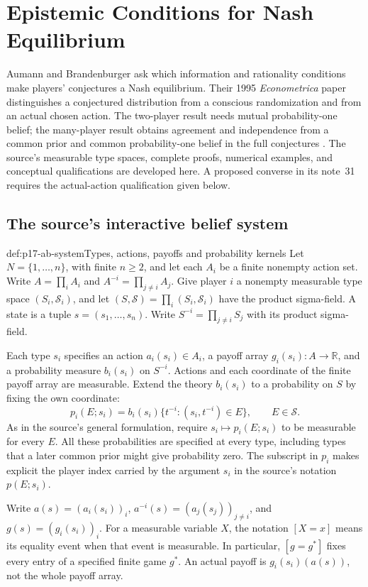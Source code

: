 \chapter{Epistemic Conditions for Nash Equilibrium}
\label{sec:p17-epistemic-nash-conditions}

Aumann and Brandenburger ask which information and rationality conditions
make players' conjectures a Nash equilibrium. Their 1995 \emph{Econometrica}
paper distinguishes a conjectured distribution from a conscious randomization
and from an actual chosen action. The two-player result needs mutual
probability-one belief; the many-player result obtains agreement and
independence from a common prior and common probability-one belief in
the full conjectures \parencite[pp.~1161--1164]{AumannBrandenburger1995Epistemic}.
The source's measurable type spaces, complete proofs, numerical examples,
and conceptual qualifications are developed here. A proposed converse in
its note~31 requires the actual-action qualification given below.

\section{The source's interactive belief system}

\begin{hbdefinition}{def:p17-ab-system}{Types, actions, payoffs and probability kernels}
Let \(N=\{1,\ldots,n\}\), with finite \(n\geq2\), and let each \(A_i\)
be a finite nonempty action set. Write \(A=\prod_iA_i\) and
\(A^{-i}=\prod_{j\ne i}A_j\). Give player \(i\) a nonempty measurable
type space \((S_i,\mathcal S_i)\), and let
\((S,\mathcal S)=\prod_i(S_i,\mathcal S_i)\) have the product sigma-field.
A state is a tuple \(s=(s_1,\ldots,s_n)\).
Write \(S^{-i}=\prod_{j\ne i}S_j\) with its product sigma-field.

Each type \(s_i\) specifies an action \(a_i(s_i)\in A_i\), a payoff
array \(g_i(s_i):A\to\mathbb R\), and a probability measure
\(b_i(s_i)\) on \(S^{-i}\). Actions and each coordinate of the
finite payoff array are measurable. Extend the theory \(b_i(s_i)\)
to a probability on \(S\) by fixing the own coordinate:
\[
 p_i(E;s_i)=b_i(s_i)\{t^{-i}:(s_i,t^{-i})\in E\},
 \qquad E\in\mathcal S.
\]
As in the source's general formulation, require
\(s_i\mapsto p_i(E;s_i)\) to be measurable for every \(E\).
All these probabilities are specified at every type, including
types that a later common prior might give probability zero.
The subscript in \(p_i\) makes explicit the player index carried
by the argument \(s_i\) in the source's notation \(p(E;s_i)\).

Write \(a(s)=(a_i(s_i))_i\), \(a^{-i}(s)=(a_j(s_j))_{j\ne i}\),
and \(g(s)=(g_i(s_i))_i\).
For a measurable variable \(X\), the notation \([X=x]\) means its
equality event when that event is measurable. In particular,
\([g=g^*]\) fixes every entry of a specified finite game \(g^*\).
An actual payoff is \(g_i(s_i)(a(s))\), not the whole payoff array.
\end{hbdefinition}

